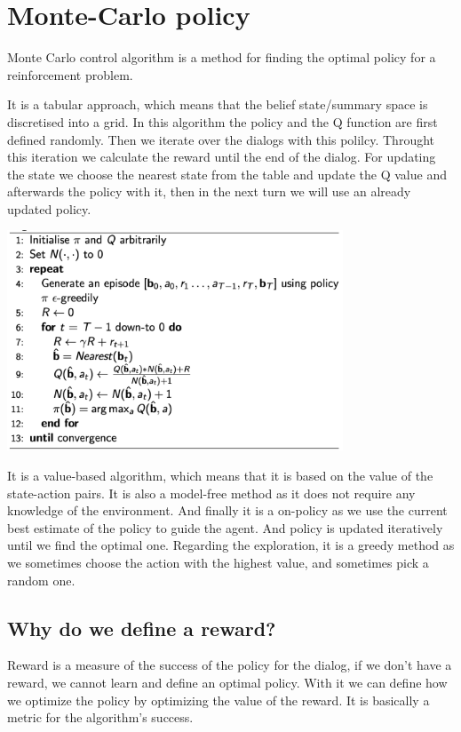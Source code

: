 \documentclass[12pt,titlepage,a4paper]{article}
\begin{document}
\section{Monte-Carlo policy}

Monte Carlo control algorithm is a method for finding the optimal policy for a reinforcement problem.

\noindent It is a tabular approach, which means that the belief state/summary space is discretised into a grid. In this algorithm the policy and the Q function are first defined randomly. Then we iterate over the dialogs with this polilcy. Throught this iteration we calculate the reward until the end of the dialog. For updating the state we choose the nearest state from the table and update the Q value and afterwards the policy with it, then in the next turn we will use an already updated policy. 

\begin{center}
    \includegraphics[width=10cm]{MCC.png}
\end{center}
It is a value-based algorithm, which means that it is based on the value of the state-action pairs. It is also a model-free method as it does not require any knowledge of the environment. And finally it is a on-policy as we use the current best estimate of the policy to guide the agent. And policy is updated iteratively until we find the optimal one. Regarding the exploration, it is a greedy method as we sometimes choose the action with the highest value, and sometimes pick a random one.

\subsection{Why do we define a reward?}

Reward is a measure of the success of the policy for the dialog, if we don’t have a reward, we cannot learn and define an optimal policy. With it we can define how we optimize the policy by optimizing the value of the reward. It is basically a metric for the algorithm's success.
\end{document}
